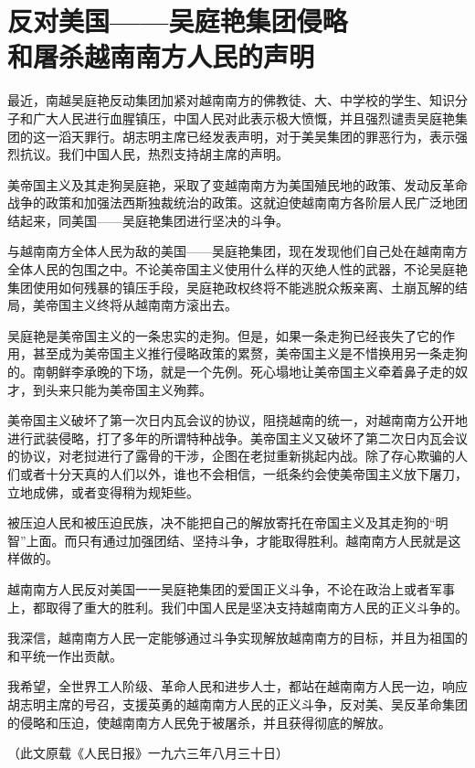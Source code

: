 \section[反对美国——吴庭艳集团侵略和屠杀越南南方人民的声明（一九六三年八月二十九日）]{反对美国——吴庭艳集团侵略\\和屠杀越南南方人民的声明}


最近，南越吴庭艳反动集团加紧对越南南方的佛教徒、大、中学校的学生、知识分子和广大人民进行血腥镇压，中国人民对此表示极大愤慨，并且强烈谴责吴庭艳集团的这一滔天罪行。胡志明主席已经发表声明，对于美吴集团的罪恶行为，表示强烈抗议。我们中国人民，热烈支持胡主席的声明。

美帝国主义及其走狗吴庭艳，采取了变越南南方为美国殖民地的政策、发动反革命战争的政策和加强法西斯独裁统治的政策。这就迫使越南南方各阶层人民广泛地团结起来，同美国——吴庭艳集团进行坚决的斗争。

与越南南方全体人民为敌的美国——吴庭艳集团，现在发现他们自己处在越南南方全体人民的包围之中。不论美帝国主义使用什么样的灭绝人性的武器，不论吴庭艳集团使用如何残暴的镇压手段，吴庭艳政权终将不能逃脱众叛亲离、土崩瓦解的结局，美帝国主义终将从越南南方滚出去。

吴庭艳是美帝国主义的一条忠实的走狗。但是，如果一条走狗已经丧失了它的作用，甚至成为美帝国主义推行侵略政策的累赘，美帝国主义是不惜换用另一条走狗的。南朝鲜李承晚的下场，就是一个先例。死心塌地让美帝国主义牵着鼻子走的奴才，到头来只能为美帝国主义殉葬。

美帝国主义破坏了第一次日内瓦会议的协议，阻挠越南的统一，对越南南方公开地进行武装侵略，打了多年的所谓特种战争。美帝国主义又破坏了第二次日内瓦会议的协议，对老挝进行了露骨的干涉，企图在老挝重新挑起内战。除了存心欺骗的人们或者十分天真的人们以外，谁也不会相信，一纸条约会使美帝国主义放下屠刀，立地成佛，或者变得稍为规矩些。

被压迫人民和被压迫民族，决不能把自己的解放寄托在帝国主义及其走狗的“明智”上面。而只有通过加强团结、坚持斗争，才能取得胜利。越南南方人民就是这样做的。

越南南方人民反对美国一一吴庭艳集团的爱国正义斗争，不论在政治上或者军事上，都取得了重大的胜利。我们中国人民是坚决支持越南南方人民的正义斗争的。

我深信，越南南方人民一定能够通过斗争实现解放越南南方的目标，并且为祖国的和平统一作出贡献。

我希望，全世界工人阶级、革命人民和进步人士，都站在越南南方人民一边，响应胡志明主席的号召，支援英勇的越南南方人民的正义斗争，反对美、吴反革命集团的侵略和压迫，使越南南方人民免于被屠杀，并且获得彻底的解放。

{\raggedleft （此文原载《人民日报》一九六三年八月三十日）\par}

